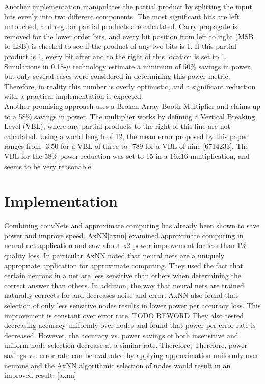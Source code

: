 \documentclass[journal]{IEEEtran}
\begin{document}
	\indent Another implementation manipulates the partial product by splitting the input bits evenly into two different components. The most significant bits are left untouched, and regular partial products are calculated. Carry propagate is removed for the lower order bits, and every bit position from left to right (MSB to LSB) is checked to see if the product of any two bits is 1. If this partial product is 1, every bit after and to the right of this location is set to 1. Simulations in 0.18-$\mu$ technology estimate a minimum of 50\% savings in power, but only several cases were considered in determining this power metric. Therefore, in reality this number is overly optimistic, and a significant reduction with a practical implementation is expected. \\
	
	\indent Another promising approach uses a Broken-Array Booth Multiplier and claims up to a 58\% savings in power. The multiplier works by defining a Vertical Breaking Level (VBL), where any partial products to the right of this line are not calculated. Using a world length of 12, the mean error proposed by this paper ranges from -3.50 for a VBL of three to -789 for a VBL of nine [6714233]. The VBL for the 58\% power reduction was set to 15 in a 16x16 multiplication, and seems to be very reasonable. 
	
\section{Implementation}
	\indent Combining convNets and approximate computing has already been shown to save power and improve speed. AxNN[axnn] examined approximate computing in neural net application and saw about x2 power improvement for less than 1\% quality loss. In particular AxNN noted that neural nets are a uniquely appropriate application for approximate computing. They used the fact that certain neurons in a net are less sensitive than others when determining the correct answer than others. In addition, the way that neural nets are trained naturally corrects for and decreases noise and error. AxNN also found that selection of only less sensitive nodes results in lower power per accuracy loss. This improvement is constant over error rate. TODO REWORD
They also tested decreasing accuracy uniformly over nodes and found that power per error rate is decreased. However, the accuracy vs. power savings of both insensitive and uniform node selection decrease at a similar rate. Therefore, 
Therefore, power savings vs. error rate can be evaluated by applying approximation uniformly over neurons and the AxNN algorithmic selection of nodes would result in an improved result. [axnn] \\ 
\end{document}
